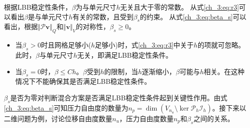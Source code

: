 根据LBB稳定性条件，$\beta$为与单元尺寸$h$无关且大于零的常数。
从式\eqref{ch_3:eq:r3}可以看出$\beta$是与单元尺寸$h$有关的常数，且受到$\beta_s$的约束。
从式\eqref{ch_3:eq:beta_s}可以看出，根据$\Vert \mathcal P \boldsymbol v\Vert_Q$和$\Vert \boldsymbol v\Vert_V$的对称性，$\beta_s\geq 0$。
\begin{itemize}
    \item 当$\beta_s> 0$时且网格足够小($h$足够小)时，式\eqref{ch_3:eq:r3}中关于$h$的项就可忽略。此时，$\beta$与单元尺寸$h$无关，即满足LBB稳定性条件。
    \item 当$\beta_s= 0$时，$\beta\leq Ch$。$\beta$受到$h$的限制，当$h$逐渐缩小，$\beta$可能与$h$相关。在这种情况下不能确保其是否满足LBB稳定性条件。
\end{itemize}

$\beta_s$是否为零对判断混合方案是否满足LBB稳定性条件起到关键性作用。由式\eqref{ch_3:eq:beta_s}可知压力自由度的数量为$ n_p = \dim(V_{n_u}\setminus\ker \mathcal P_h \mathcal I_h)$。接下来以二维问题为例，讨论位移自由度数量$n_u$，压力自由度数量$n_p$和$\beta_s$之间的关系。

